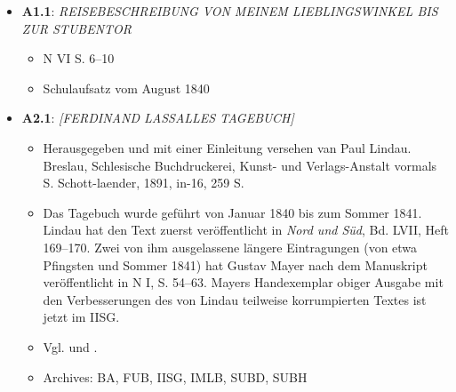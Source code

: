 \begin{itemize}
    \item \textbf{A1.1}: \textit{REISEBESCHREIBUNG VON MEINEM LIEBLINGSWINKEL BIS ZUR STUBENTOR}
    \begin{itemize}
        \item N VI S. 6--10
        \item Schulaufsatz vom August 1840
    \end{itemize}
    
    \item \textbf{A2.1}: \textit{[FERDINAND LASSALLES TAGEBUCH]}
    \begin{itemize}
        \item Herausgegeben und mit einer Einleitung versehen van Paul Lindau. Breslau, Schlesische Buchdruckerei, Kunst- und Verlags-Anstalt vormals S. Schott-laender, 1891, in-16, 259 S.
        \item Das Tagebuch wurde geführt von Januar 1840 bis zum Sommer 1841. Lindau hat den Text zuerst veröffentlicht in \textit{Nord und Süd}, Bd. LVII, Heft 169--170. Zwei von ihm ausgelassene längere Eintragungen (von etwa Pfingsten und Sommer 1841) hat Gustav Mayer nach dem Manuskript veröffentlicht in N I, S. 54--63. Mayers Handexemplar obiger Ausgabe mit den Verbesserungen des von Lindau teilweise korrumpierten Textes ist jetzt im IISG.
        \item Vgl.  und .
        \item Archives: BA, FUB, IISG, IMLB, SUBD, SUBH
    \end{itemize}
    
    
    

\end{itemize}
